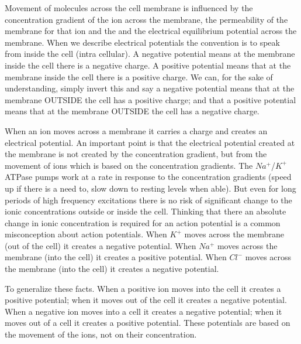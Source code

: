 
Movement of molecules across the cell membrane is influenced by the concentration gradient of the ion across the membrane, the permeability of the membrane for that ion and the and the electrical equilibrium potential across the membrane. When we describe electrical potentials the convention is to speak from inside the cell (intra cellular). A negative potential means at the membrane inside the cell there is a negative charge. A positive potential means that at the membrane inside the cell there is a positive charge. We can, for the sake of understanding, simply invert this and say a negative potential means that at the membrane OUTSIDE the cell has a positive charge; and that a positive potential means that at the membrane OUTSIDE the cell has a negative charge.

When an ion moves across a membrane it carries a charge and creates an electrical potential. An important point is that the electrical potential created at the membrane is not created by the concentration gradient, but from the movement of ions which is based on the concentration gradients.  The $Na^+$/$K^+$ ATPase pumps work at a rate in response to the concentration gradients (speed up if there is a need to, slow down to resting levels when able). But even for long periods of high frequency excitations there is no risk of significant change to the ionic concentrations outside or inside the cell. Thinking that there an absolute change in ionic concentration is required for an action potential is a common misconception about action potentials\cite{silverthorn_uncovering_2002}. When $K^+$ moves across the membrane (out of the cell) it creates a negative potential. When $Na^+$ moves across the membrane (into the cell) it creates a positive potential. When $Cl^-$ moves across the membrane (into the cell) it creates a negative potential. 

To generalize these facts. When a positive ion moves into the cell it creates a positive potential; when it moves out of the cell it creates a negative potential. When a negative ion moves into a cell it creates a negative potential; when it moves out of a cell it creates a positive potential. These potentials are based on the movement of the ions, not on their concentration. 

